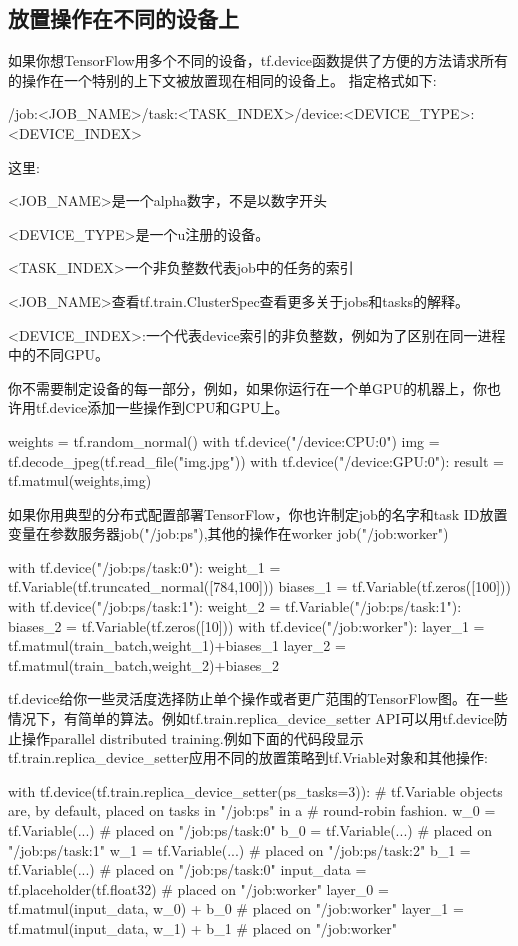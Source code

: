 \subsection{放置操作在不同的设备上}
如果你想TensorFlow用多个不同的设备，tf.device函数提供了方便的方法请求所有的操作在一个特别的上下文被放置现在相同的设备上。
指定格式如下:
\begin{python}
/job:<JOB_NAME>/task:<TASK_INDEX>/device:<DEVICE_TYPE>:<DEVICE_INDEX>
\end{python}
这里:
\begin{python}
\item <JOB_NAME>是一个alpha数字，不是以数字开头
\item <DEVICE_TYPE>是一个u注册的设备。
\item <TASK_INDEX>一个非负整数代表job中的任务的索引
\item <JOB_NAME>查看tf.train.ClusterSpec查看更多关于jobs和tasks的解释。
\item <DEVICE_INDEX>:一个代表device索引的非负整数，例如为了区别在同一进程中的不同GPU。
\end{python}
你不需要制定设备的每一部分，例如，如果你运行在一个单GPU的机器上，你也许用tf.device添加一些操作到CPU和GPU上。
\begin{python}
weights = tf.random_normal()
with tf.device("/device:CPU:0")
    img = tf.decode_jpeg(tf.read_file("img.jpg"))
with tf.device("/device:GPU:0"):
    result = tf.matmul(weights,img)
\end{python}
如果你用典型的分布式配置部署TensorFlow，你也许制定job的名字和task ID放置变量在参数服务器job("/job:ps"),其他的操作在worker job("/job:worker")
\begin{python}
with tf.device("/job:ps/task:0"):
    weight_1 = tf.Variable(tf.truncated_normal([784,100]))
    biases_1 = tf.Variable(tf.zeros([100]))
with tf.device("/job:ps/task:1"):
    weight_2 = tf.Variable("/job:ps/task:1"):
    biases_2 = tf.Variable(tf.zeros([10]))
with tf.device("/job:worker"):
    layer_1 = tf.matmul(train_batch,weight_1)+biases_1
    layer_2 = tf.matmul(train_batch,weight_2)+biases_2
\end{python}
tf.device给你一些灵活度选择防止单个操作或者更广范围的TensorFlow图。在一些情况下，有简单的算法。例如tf.train.replica_device_setter API可以用tf.device防止操作parallel distributed training.例如下面的代码段显示tf.train.replica_device_setter应用不同的放置策略到tf.Vriable对象和其他操作:
\begin{python}
with tf.device(tf.train.replica_device_setter(ps_tasks=3)):
# tf.Variable objects are, by default, placed on tasks in "/job:ps" in a
# round-robin fashion.
    w_0 = tf.Variable(...)  # placed on "/job:ps/task:0"
    b_0 = tf.Variable(...)  # placed on "/job:ps/task:1"
    w_1 = tf.Variable(...)  # placed on "/job:ps/task:2"
    b_1 = tf.Variable(...)  # placed on "/job:ps/task:0"
    input_data = tf.placeholder(tf.float32)     # placed on "/job:worker"
    layer_0 = tf.matmul(input_data, w_0) + b_0  # placed on "/job:worker"
    layer_1 = tf.matmul(input_data, w_1) + b_1  # placed on "/job:worker"
\end{python}
